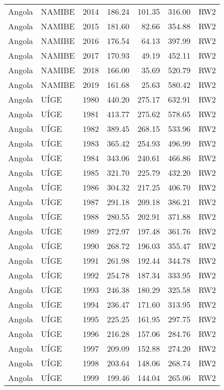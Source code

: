 \begin{longtable}{lllrrrl}
  Angola & NAMIBE & 2014 & 186.24 & 101.35 & 316.00 & RW2 \\ 
  Angola & NAMIBE & 2015 & 181.60 & 82.66 & 354.88 & RW2 \\ 
  Angola & NAMIBE & 2016 & 176.54 & 64.13 & 397.99 & RW2 \\ 
  Angola & NAMIBE & 2017 & 170.93 & 49.19 & 452.11 & RW2 \\ 
  Angola & NAMIBE & 2018 & 166.00 & 35.69 & 520.79 & RW2 \\ 
  Angola & NAMIBE & 2019 & 161.68 & 25.63 & 580.42 & RW2 \\ 
  Angola & UÍGE & 1980 & 440.20 & 275.17 & 632.91 & RW2 \\ 
  Angola & UÍGE & 1981 & 413.77 & 275.62 & 578.65 & RW2 \\ 
  Angola & UÍGE & 1982 & 389.45 & 268.15 & 533.96 & RW2 \\ 
  Angola & UÍGE & 1983 & 365.42 & 254.93 & 496.99 & RW2 \\ 
  Angola & UÍGE & 1984 & 343.06 & 240.61 & 466.86 & RW2 \\ 
  Angola & UÍGE & 1985 & 321.70 & 225.79 & 432.20 & RW2 \\ 
  Angola & UÍGE & 1986 & 304.32 & 217.25 & 406.70 & RW2 \\ 
  Angola & UÍGE & 1987 & 291.18 & 209.18 & 386.21 & RW2 \\ 
  Angola & UÍGE & 1988 & 280.55 & 202.91 & 371.88 & RW2 \\ 
  Angola & UÍGE & 1989 & 272.97 & 197.48 & 361.76 & RW2 \\ 
  Angola & UÍGE & 1990 & 268.72 & 196.03 & 355.47 & RW2 \\ 
  Angola & UÍGE & 1991 & 261.98 & 192.44 & 344.78 & RW2 \\ 
  Angola & UÍGE & 1992 & 254.78 & 187.34 & 333.95 & RW2 \\ 
  Angola & UÍGE & 1993 & 246.38 & 180.29 & 325.58 & RW2 \\ 
  Angola & UÍGE & 1994 & 236.47 & 171.60 & 313.95 & RW2 \\ 
  Angola & UÍGE & 1995 & 225.25 & 161.95 & 297.75 & RW2 \\ 
  Angola & UÍGE & 1996 & 216.28 & 157.06 & 284.76 & RW2 \\ 
  Angola & UÍGE & 1997 & 209.09 & 152.88 & 274.20 & RW2 \\ 
  Angola & UÍGE & 1998 & 203.64 & 148.06 & 268.74 & RW2 \\ 
  Angola & UÍGE & 1999 & 199.46 & 144.04 & 265.06 & RW2 \\ 

\end{longtable}
